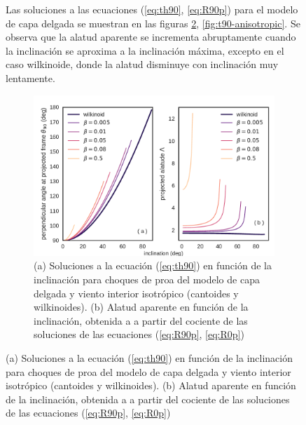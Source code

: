 \begin{figure}
Las soluciones a las ecuaciones (\ref{eq:th90}, \ref{eq:R90p}) para el modelo de capa delgada se muestran en las figuras \ref{fig:t90-isotropic}, \ref{fig:t90-anisotropic}. Se observa que la alatud aparente se incrementa abruptamente cuando la inclinación se aproxima a la inclinación máxima, excepto en el caso wilkinoide, donde la alatud disminuye con inclinación muy lentamente.

\begin{figure}
  \centering
  \includegraphics[width=\linewidth]{./Figures/cantoid-th90-vs-i}
  \caption[$\theta_{90}$ y alatud aparente en función de la inclinación para choques cantoides y wilkinoides.]{(a) Soluciones a la ecuación (\ref{eq:th90}) en función de la inclinación para choques de proa del modelo de capa delgada y viento interior isotrópico (cantoides y wilkinoides). (b) Alatud aparente en función de la inclinación, obtenida a a partir del cociente de las soluciones de las ecuaciones (\ref{eq:R90p}, \ref{eq:R0p})}
  \label{fig:t90-isotropic}
\end{figure}


\end{figure}
